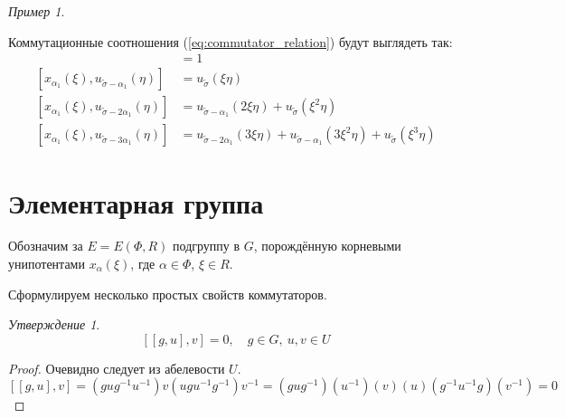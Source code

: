 \documentclass[15pt]{article}
\theoremstyle{remark}
\newtheorem{prop}{Утверждение}
\newtheorem{example}{Пример}
\begin{document}
\begin{example}
\begin{center}
\end{center}

\end{example}

Коммутационные соотношения (\ref{eq:commutator_relation}) будут выглядеть так:
\begin{align*}
[x_{\alpha_1}(\xi), u_{\widetilde\sigma}(\eta)] & = 1\\
[x_{\alpha_1}(\xi), u_{\widetilde\sigma-\alpha_1}(\eta)] & = u_{\widetilde\sigma}(\xi\eta)\\
[x_{\alpha_1}(\xi), u_{\widetilde\sigma-2\alpha_1}(\eta)] & = u_{\widetilde\sigma-\alpha_1}(2\xi\eta)+u_{\widetilde\sigma}(\xi^2\eta)\\
[x_{\alpha_1}(\xi), u_{\widetilde\sigma-3\alpha_1}(\eta)] & = u_{\widetilde\sigma-2\alpha_1}(3\xi\eta)+u_{\widetilde\sigma-\alpha_1}(3\xi^2\eta)+u_{\widetilde\sigma}(\xi^3\eta)
\end{align*}

\section{Элементарная группа}

Обозначим за $E = E(\Phi,R)$ подгруппу в $G$, порождённую корневыми унипотентами $x_\alpha(\xi)$, где $\alpha \in \Phi$, $\xi \in R$.

Сформулируем несколько простых свойств коммутаторов.

\begin{prop}
  $$[[g,u],v] = 0, \quad g \in G, \ u,v \in U $$
\end{prop}
\begin{proof}
  Очевидно следует из абелевости $U$.
  $$ [[g,u],v] = (g u g^{-1} u^{-1}) v (u g u^{-1} g^{-1}) v^{-1} = (gug^{-1}) (u^{-1}) (v) (u) (g^{-1}u^{-1}g) (v^{-1}) = 0$$
\end{proof}
\end{document}
